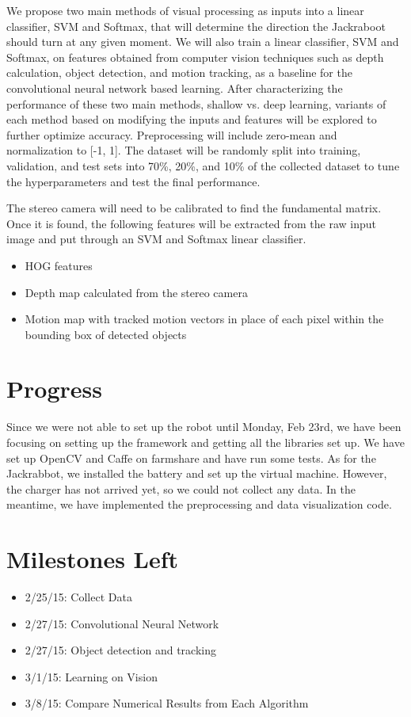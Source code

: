 \documentclass[12pt]{article}
\begin{document}
We propose two main methods of visual processing as inputs into a linear classifier, SVM and Softmax, that will determine the direction the Jackraboot should turn at any given moment. We will also train a linear classifier, SVM and Softmax, on features obtained from computer vision techniques such as depth calculation, object detection, and motion tracking, as a baseline for the convolutional neural network based learning. After characterizing the performance of these two main methods, shallow vs. deep learning, variants of each method based on modifying the inputs and features will be explored to further optimize accuracy. Preprocessing will include zero-mean and normalization to [-1, 1]. The dataset will be randomly split into training, validation, and test sets into 70\%, 20\%, and 10\% of the collected dataset to tune the hyperparameters and test the final performance.

The stereo camera will need to be calibrated to find the fundamental matrix. Once it is found,  the following features will be extracted from the raw input image and put through an SVM and Softmax linear classifier. 

\begin{itemize}
\item HOG features
\item Depth map calculated from the stereo camera
\item Motion map with tracked motion vectors in place of each pixel within the bounding box of detected objects
\end{itemize}


\section{Progress}
Since we were not able to set up the robot until Monday, Feb 23rd, we have been focusing on setting up the framework and getting all the libraries set up. We have set up OpenCV and Caffe on farmshare and have run some tests. As for the Jackrabbot, we installed the battery and set up the virtual machine. However, the charger has not arrived yet, so we could not collect any data. In the meantime, we have implemented the preprocessing and data visualization code.

\section{Milestones Left}
\begin{itemize}
\item 2/25/15: Collect Data
\item 2/27/15: Convolutional Neural Network
\item 2/27/15: Object detection and tracking
\item 3/1/15: Learning on Vision
\item 3/8/15: Compare Numerical Results from Each Algorithm
\end{itemize}
\end{document}
